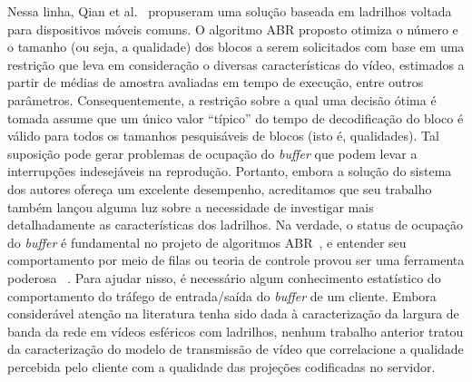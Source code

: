 Nessa linha, Qian et al.~\cite{Qian2018} propuseram uma solução baseada em ladrilhos voltada para dispositivos móveis comuns. O algoritmo ABR proposto otimiza o número e o tamanho (ou seja, a qualidade) dos blocos a serem solicitados com base em uma restrição que leva em consideração o diversas características do vídeo, estimados a partir de médias de amostra avaliadas em tempo de execução, entre outros parâmetros. Consequentemente, a restrição sobre a qual uma decisão ótima é tomada assume que um único valor “típico” do tempo de decodificação do bloco é válido para todos os tamanhos pesquisáveis de blocos (isto é, qualidades). Tal suposição pode gerar problemas de ocupação do \textit{buffer} que podem levar a interrupções indesejáveis na reprodução. Portanto, embora a solução do sistema dos autores ofereça um excelente desempenho, acreditamos que seu trabalho também lançou alguma luz sobre a necessidade de investigar mais detalhadamente as características dos ladrilhos. Na verdade, o status de ocupação do \textit{buffer} é fundamental no projeto de algoritmos ABR~\cite{Huang2014}, e entender seu comportamento por meio de filas ou teoria de controle provou ser uma ferramenta poderosa~\cite{Huang2014,Yin2015,Spiteri2016,Yadav2017} . Para ajudar nisso, é necessário algum conhecimento estatístico do comportamento do tráfego de entrada/saída do \textit{buffer} de um cliente. Embora considerável atenção na literatura tenha sido dada à caracterização da largura de banda da rede em vídeos esféricos com ladrilhos, nenhum trabalho anterior tratou da caracterização do modelo de transmissão de vídeo que correlacione a qualidade percebida pelo cliente com a qualidade das projeções codificadas no servidor.






